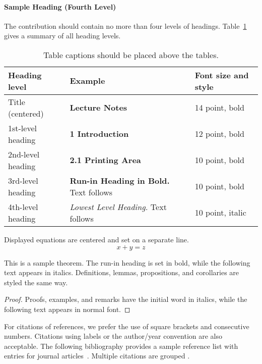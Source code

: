 \documentclass[runningheads]{llncs}
\begin{document}
\paragraph{Sample Heading (Fourth Level)}
The contribution should contain no more than four levels of
headings. Table~\ref{tab1} gives a summary of all heading levels.

\begin{table}
\caption{Table captions should be placed above the tables.}\label{tab1}
    \begin{tabular}{|l|l|l|}
    \hline
    Heading level &  Example & Font size and style\\
    \hline
    Title (centered) &  {\Large\bfseries Lecture Notes} & 14 point, bold\\
    1st-level heading &  {\large\bfseries 1 Introduction} & 12 point, bold\\
    2nd-level heading & {\bfseries 2.1 Printing Area} & 10 point, bold\\
    3rd-level heading & {\bfseries Run-in Heading in Bold.} Text follows & 10 point, bold\\
    4th-level heading & {\itshape Lowest Level Heading.} Text follows & 10 point, italic\\
    \hline
    \end{tabular}
\end{table}


\noindent Displayed equations are centered and set on a separate
line.
\begin{equation}
x + y = z
\end{equation}

\begin{theorem}
This is a sample theorem. The run-in heading is set in bold, while
the following text appears in italics. Definitions, lemmas,
propositions, and corollaries are styled the same way.
\end{theorem}
%
%
\begin{proof}
Proofs, examples, and remarks have the initial word in italics,
while the following text appears in normal font.
\end{proof}

For citations of references, we prefer the use of square brackets and consecutive numbers. Citations using labels or the author/year
convention are also acceptable. The following bibliography provides
a sample reference list with entries for journal
articles~\cite{wegman1981new}. Multiple citations are grouped
\cite{wegman1981new,bernstein2018towards,bellare1998relations}.
\end{document}
